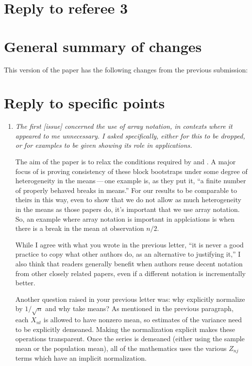 \documentclass[12pt]{article}
\begin{document}
\section*{\hfill Reply to referee 3\hfill}
\section*{General summary of changes}
This version of the paper has the following changes from the
previous submission:


\section*{Reply to specific points}

\begin{enumerate}
\item \textit{The first [issue] concerned the use of array notation,
    in contexts where it appeared to me unnecessary. I asked
    specifically, either for this to be dropped, or for examples to be
    given showing its role in applications.}

  The aim of the paper is to relax the conditions required by
  \cite{GoW:02} and \cite{GoJ:03}. A major focus of \cite{GoW:02} is
  proving consistency of these block bootstraps under some degree of
  heterogeneity in the means\,---\,one example is, as they put it, ``a
  finite number of properly behaved breaks in means.'' For our results
  to be comparable to theirs in this way, even to show that we do not
  allow as much heterogeneity in the means as those papers do, it's
  important that we use array notation. So, an example where array
  notation is important in applciations is when there is a break in
  the mean at observation $n/2$.

  While I agree with what you wrote in the previous letter, ``it is
  never a good practice to copy what other authors do, as an
  alternative to justifying it,'' I also think that readers generally
  benefit when authors reuse decent notation from other closely
  related papers, even if a different notation is incrementally
  better.

  Another question raised in your previous letter was: why explicitly
  normalize by $1/\sqrt{n}$ and why take means? As mentioned in the
  previous paragraph, each $X_{nt}$ is allowed to have nonzero mean,
  so estimates of the variance need to be explicitly demeaned. Making
  the normalization explicit makes these operations transparent. Once
  the series is demeaned (either using the sample mean or the
  population mean), all of the mathematics uses the various $Z_{nj}$
  terms which have an implicit normalization.


\end{enumerate}
\end{document}

